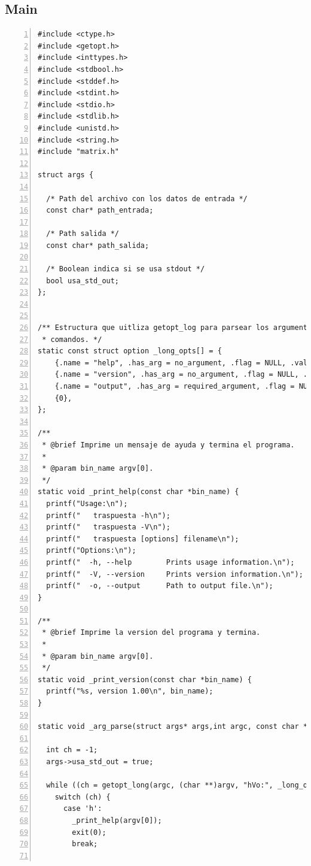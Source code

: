 \documentclass[11pt,a4paper]{article}
\begin{document}
\subsection{Main}

\begin{lstlisting}[numbers=left, tabsize=2, basicstyle=\fontsize{11}{13}\ttfamily, frame=single, caption={makefile}]
#include <ctype.h>
#include <getopt.h>
#include <inttypes.h>
#include <stdbool.h>
#include <stddef.h>
#include <stdint.h>
#include <stdio.h>
#include <stdlib.h>
#include <unistd.h>
#include <string.h>
#include "matrix.h"

struct args {

  /* Path del archivo con los datos de entrada */
  const char* path_entrada;

  /* Path salida */
  const char* path_salida;
  
  /* Boolean indica si se usa stdout */
  bool usa_std_out;
};


/** Estructura que uitliza getopt_log para parsear los argumentos de linea de
 * comandos. */
static const struct option _long_opts[] = {
    {.name = "help", .has_arg = no_argument, .flag = NULL, .val = 'h'},
    {.name = "version", .has_arg = no_argument, .flag = NULL, .val = 'V'},
    {.name = "output", .has_arg = required_argument, .flag = NULL, .val = 'o'},
    {0},
};

/**
 * @brief Imprime un mensaje de ayuda y termina el programa.
 *
 * @param bin_name argv[0].
 */
static void _print_help(const char *bin_name) {
  printf("Usage:\n");
  printf("   traspuesta -h\n");
  printf("   traspuesta -V\n");
  printf("   traspuesta [options] filename\n");
  printf("Options:\n");
  printf("  -h, --help        Prints usage information.\n");
  printf("  -V, --version     Prints version information.\n");
  printf("  -o, --output      Path to output file.\n");
}

/**
 * @brief Imprime la version del programa y termina.
 *
 * @param bin_name argv[0].
 */
static void _print_version(const char *bin_name) {
  printf("%s, version 1.00\n", bin_name);
}

static void _arg_parse(struct args* args,int argc, const char **argv) {
    
  int ch = -1;
  args->usa_std_out = true;

  while ((ch = getopt_long(argc, (char **)argv, "hVo:", _long_opts, NULL)) != -1) {
    switch (ch) {
      case 'h':
        _print_help(argv[0]);
        exit(0);
        break;


\end{lstlisting}
\end{document}
